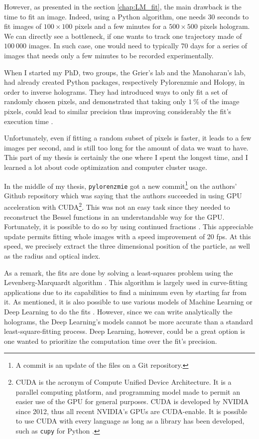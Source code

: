 However, as presented in the section \ref{chap:LM_fit}, the main drawback is the time to fit an image. Indeed, using a Python algorithm, one needs $30$ seconds to fit images of $100 \times  100$ pixels and a few minutes for a $500\times 500$ pixels hologram. We can directly see a bottleneck, if one wants to track one trajectory made of $100~000$ images. In such case, one would need to typically 70 days for a series of images that needs only a few minutes to be recorded experimentally. 

When I started my PhD, two groups, the Grier's lab and the Manoharan's lab, had already created Python packages, respectively Pylorenzmie and Holopy, in order to inverse holograms. They had introduced ways to only fit a set of randomly chosen pixels, and demonstrated that taking only $1~\%$ of the image pixels, could lead to similar precision thus improving considerably the fit's execution time \cite{dimiduk_random-subset_2014}.

Unfortunately, even if fitting  a random subset of pixels is faster, it leads to a few images per second, and is still too long for the amount of data we want to have. This part of my thesis is certainly the one where I spent the longest time, and I learned a lot about code optimization and computer cluster usage. 

In the middle of my thesis, \texttt{pylorenzmie} got a new commit\footnote{A commit is an update of the files on a Git repository.} on the authors' Github repository which was saying that the authors succeeded in using GPU acceleration with CUDA\footnote{CUDA is the acronym of Compute Unified Device Architecture. It is a parallel computing platform, and programming model made to permit an easier use of the GPU for general purposes. CUDA is developed by NVIDIA since 2012, thus all recent NVIDIA's GPUs are CUDA-enable. It is possible to use CUDA with every language as long as a library has been developed, such as \texttt{cupy} for Python \href{https://github.com/cupy/cupy}{\faGithub}.}. This was not an easy task since they needed to reconstruct the Bessel functions in an understandable way for the GPU. Fortunately, it is possible to do so by using continued fractions \cite{lentz_generating_1976}. This appreciable update permits fitting whole images with a speed improvement of 20 fps. At this speed, we  precisely extract the three dimensional position of the particle, as well as the radius and optical index. 

As a remark, the fits are done by solving a least-squares problem using the Levenberg-Marquardt algorithm \cite{more_levenberg-marquardt_1978}. This algorithm is largely used in curve-fitting applications due to its capabilities to find a minimum even by starting far from it. As mentioned, it is also possible to use various models of Machine Learning or Deep Learning to do the fits \cite{altman_catch_2020}. However, since we can write analytically the holograms, the Deep Learning’s models cannot be more accurate than a standard least-square-fitting process. Deep Learning, however, could be a great option is one wanted to prioritize the computation time over the fit's precision.


